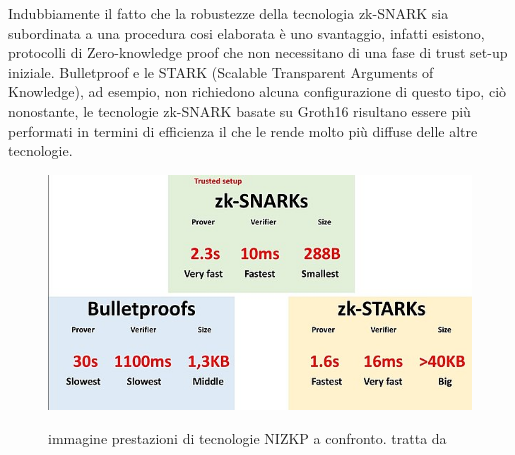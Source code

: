 Indubbiamente il fatto che la robustezze della tecnologia zk-SNARK sia subordinata a una procedura cosi elaborata è uno
svantaggio, infatti esistono, protocolli di Zero-knowledge proof che non necessitano di una fase di trust set-up
iniziale. Bulletproof e le STARK (Scalable Transparent Arguments of Knowledge), ad esempio, non richiedono alcuna
configurazione di questo tipo, ciò nonostante, le tecnologie  zk-SNARK basate su Groth16 risultano essere più performati in termini di
efficienza il che le rende molto più diffuse delle altre tecnologie.
\begin{figure}[H]
    \centering
    \includegraphics[width=13cm]{./chapters/1.state-of-art/images/14.diff_zk.png}
    \label{fig:different_zk}
    \captionsetup{justification=centering}
    \caption{immagine prestazioni di tecnologie NIZKP a confronto. tratta da \cite{non_interactive_zero_knowledge_proof}}
\end{figure}
